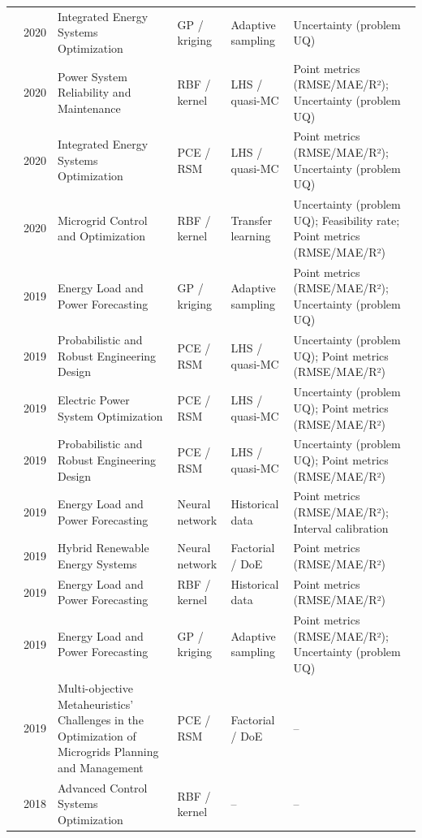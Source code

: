 \begin{longtable}{@{}p{} p{} p{} p{} p{} p{}@{}}
  \cite{Simonson202036} & 2020 & Integrated Energy Systems Optimization & GP / kriging & Adaptive sampling & Uncertainty (problem UQ) \\
  \cite{Urgun20202791} & 2020 & Power System Reliability and Maintenance & RBF / kernel & LHS / quasi-MC & Point metrics (RMSE/MAE/R²); Uncertainty (problem UQ) \\
  \cite{Wang2020202933} & 2020 & Integrated Energy Systems Optimization & PCE / RSM & LHS / quasi-MC & Point metrics (RMSE/MAE/R²); Uncertainty (problem UQ) \\
  \cite{Zhang20203731} & 2020 & Microgrid Control and Optimization & RBF / kernel & Transfer learning & Uncertainty (problem UQ); Feasibility rate; Point metrics (RMSE/MAE/R²) \\
  \cite{Eseye201991463} & 2019 & Energy Load and Power Forecasting & GP / kriging & Adaptive sampling & Point metrics (RMSE/MAE/R²); Uncertainty (problem UQ) \\
  \cite{Li20191438} & 2019 & Probabilistic and Robust Engineering Design & PCE / RSM & LHS / quasi-MC & Uncertainty (problem UQ); Point metrics (RMSE/MAE/R²) \\
  \cite{Lu201991827} & 2019 & Electric Power System Optimization & PCE / RSM & LHS / quasi-MC & Uncertainty (problem UQ); Point metrics (RMSE/MAE/R²) \\
  \cite{Muhlpfordt20194806} & 2019 & Probabilistic and Robust Engineering Design & PCE / RSM & LHS / quasi-MC & Uncertainty (problem UQ); Point metrics (RMSE/MAE/R²) \\
  \cite{Park2019} & 2019 & Energy Load and Power Forecasting & Neural network & Historical data & Point metrics (RMSE/MAE/R²); Interval calibration \\
  \cite{Roth2019214} & 2019 & Hybrid Renewable Energy Systems & Neural network & Factorial / DoE & Point metrics (RMSE/MAE/R²) \\
  \cite{Wang20192635} & 2019 & Energy Load and Power Forecasting & RBF / kernel & Historical data & Point metrics (RMSE/MAE/R²) \\
  \cite{Yan2019625} & 2019 & Energy Load and Power Forecasting & GP / kriging & Adaptive sampling & Point metrics (RMSE/MAE/R²); Uncertainty (problem UQ) \\
  \cite{salgueiro_multi-objective_2019} & 2019 & Multi-objective Metaheuristics' Challenges in the Optimization of Microgrids Planning and Management & PCE / RSM & Factorial / DoE & -- \\
  \cite{Dullinger20181646} & 2018 & Advanced Control Systems Optimization & RBF / kernel & -- & -- \\

\end{longtable}
